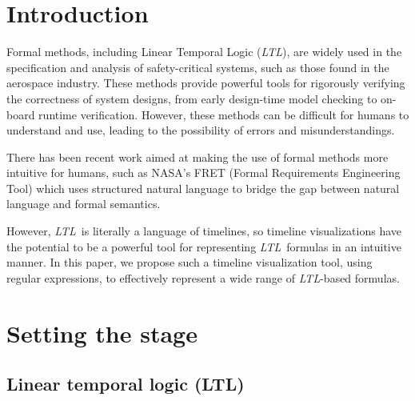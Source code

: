 \documentclass[preprint,12pt]{elsarticle}
\theoremstyle{definition}
\theoremstyle{remark}
\newcommand{\ltl}{\textit{LTL}}
\begin{document}
\section{Introduction}

Formal methods, including Linear Temporal Logic (\ltl), are widely used in the specification and analysis of safety-critical systems, such as those found in the aerospace industry. These methods provide powerful tools for rigorously verifying the correctness of system designs, from early design-time model checking to on-board runtime verification. However, these methods can be difficult for humans to understand and use, leading to the possibility of errors and misunderstandings.

There has been recent work aimed at making the use of formal methods more intuitive for humans, such as NASA's FRET (Formal Requirements Engineering Tool) \cite{GPMS20} which uses structured natural language to bridge the gap between natural language and formal semantics.

However, \ltl\ is literally a language of timelines, so timeline visualizations have the potential to be a powerful tool for representing \ltl\ formulas in an intuitive manner. In this paper, we propose such a timeline visualization tool, using regular expressions, to effectively represent a wide range of \ltl-based formulas.

\section{Setting the stage}

\subsection{Linear temporal logic (LTL)}
\end{document}
